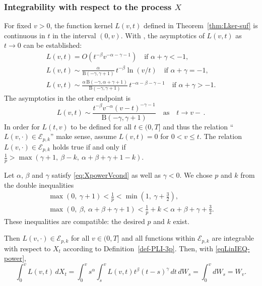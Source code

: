 \documentclass{article}
\newcommand{\vS}{v}
\theoremstyle{plain}
\theoremstyle{remark}
\theoremstyle{definition}
\begin{document}
\subsubsection*{Integrability
with respect to the process \boldmath$X$}
For fixed $v>0$, the function
kernel $L(v,t)$ defined in
Theorem~\ref{thm:Lker-suf}
is continuous in $t$ in the interval
$(0,v)$.
With \cite[Lemma~4]{Part 1},
the asymptotics of $L(v,t)$ as
$t \to 0$ can be established:
\begin{gather*}
L(v,t) = O(t^{-\beta} v^{-\alpha-\gamma-1})
  \quad
\mbox{if $\alpha+\gamma<-1$},\\
L(v,t) \sim \frac{\alpha}{\mathrm{B}(-\gamma,\gamma{+}1)} \,
t^{-\beta} \ln(v/t)
\quad \mbox{if $\alpha+\gamma=-1$},\\
L(v,t) \sim
\frac{\alpha\, \mathrm{B}(-\gamma,\alpha{+}\gamma{+}1)}
{\mathrm{B}(-\gamma,\gamma{+}1)} \,
t^{-\alpha-\beta-\gamma-1}
\quad \mbox{if $\alpha+\gamma>-1$}.
\end{gather*}
The asymptotics in the other endpoint
is
\[
L(v,t) \sim \frac{t^{-\beta} v^{-\alpha}
(v-t)^{-\gamma-1}}
{\mathrm{B}(-\gamma, \gamma{+}1)}
\quad
\mbox{as}
\quad t\to v{-}\,.
\]
In order for $L(t,v)$ to be defined for all $t\in(0,T]$
and thus the relation ``$L(v, \mathbin{\cdot}) \in
\mathcal{E}_{p,k}$'' make sense, assume
$L(v,t) = 0$ for $0<v\le t$.
The relation $L(v, \mathbin{\cdot}) \in
\mathcal{E}_{p,k}$ holds true
if and only if
$\frac{1}{p} > \max(\gamma{+}1,\:
\beta{-}k,\:
\alpha{+}\beta{+}\gamma{+}1{-}k)$.

Let $\alpha$, $\beta$ and $\gamma$
satisfy \eqref{eq:XpowerVcond}
as well as $\gamma<0$.
We chose $p$ and $k$ from the
double inequalities
\begin{equation}\label{eq:selpk}
\begin{gathered}
\max(0, \: \gamma+1)  < \frac{1}{p} <
\min\!\left(1, \: \gamma+{\textstyle\frac32}\right), \\
\max(0, \: \beta, \: \alpha+\beta+\gamma+1)
< \frac{1}{p}+k <
\alpha+\beta+\gamma+\frac32.
\end{gathered}
\end{equation}
These inequalities are compatible:
the desired $p$ and $k$ exist.

Then $L(v,\mathbin{\cdot})
\in \mathcal{E}_{p,k}$
for all $v\in(0,T]$
and all functions within $\mathcal{E}_{p,k}$
are integrable with respect to  $X_t$
according to  Definition~\ref{def-PLI-3p}.
Then, with \eqref{eqLinIEQ-power},
\[
\int_0^v L(v,t) \, dX_t
=
\int_0^v s^\alpha \int_s^v
L(v,t) t^\beta (t-s)^\gamma \, dt \, dW_s
= \int_0^v dW_s = W_v.
\]
\end{document}
